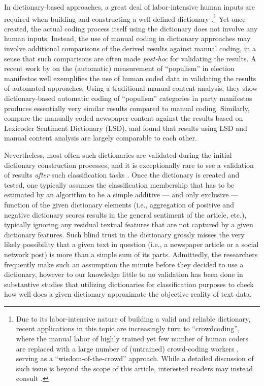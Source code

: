 \documentclass[man, 12pt, a4paper, nolmodern, noextraspace]{apa6}
\begin{document}
    In dictionary-based approaches, a great deal of labor-intensive human inputs are required when building and constructing a well-defined dictionary \parencite{YoungSoroka2012, muddiman2018re}.\footnote{Due to its labor-intensive nature of building a valid and reliable dictionary, recent applications in this topic are increasingly turn to \enquote{crowdcoding}, where the manual labor of highly trained yet few number of human coders are replaced with a large number of (untrained) crowd-coding workers \parencites[e.g.,][]{haselmayer2017sentiment, lind2017content}, serving as a \enquote{wisdom-of-the-crowd} approach. While a detailed discussion of such issue is beyond the scope of this article, interested readers may instead consult \textcite{lind2017content}.} Yet once created, the actual coding process itself using the dictionary does not involve any human inputs. Instead, the use of manual coding in dictionary approaches may involve additional comparisons of the derived results against manual coding, in a sense that such comparisons are often made \textit{post-hoc} for validating the results. A recent work by \textcite{Rooduijn2011} on the (automatic) measurement of \enquote{populism} in election manifestos well exemplifies the use of human coded data in validating the results of automated approaches. Using a traditional manual content analysis, they show dictionary-based automatic coding of \enquote{populism} categories in party manifestos produces essentially very similar results compared to manual coding. Similarly, \textcite{YoungSoroka2012} compare the manually coded newspaper content against the results based on Lexicoder Sentiment Dictionary (LSD), and found that results using LSD and manual content analysis are largely comparable to each other.
    
    Nevertheless, most often such dictionaries are validated during the initial dictionary construction processes, and it is exceptionally rare to see a validation of results \textit{after} such classification tasks \parencites[yet for notable exceptions, see][]{muddiman2018re, YoungSoroka2012, gonzalez2015signals}. Once the dictionary is created and tested, one typically assumes the classification membership that has to be estimated by an algorithm to be a simple additive --- and only exclusive --- function of the given dictionary elements (i.e., aggregation of positive and negative dictionary scores results in the general sentiment of the article, etc.), typically ignoring any residual textual features that are not captured by a given dictionary features. Such blind trust in the dictionary grossly misses the very likely possibility that a given text in question (i.e., a newspaper article or a social network post) is more than a simple sum of its parts. Admittedly, the researchers frequently make such an assumption the minute before they decided to use a dictionary, however to our knowledge little to no validation has been done in substantive studies that utilizing dictionaries for classification purposes to check how well does a given dictionary approximate the objective reality of text data.
    
\end{document}
